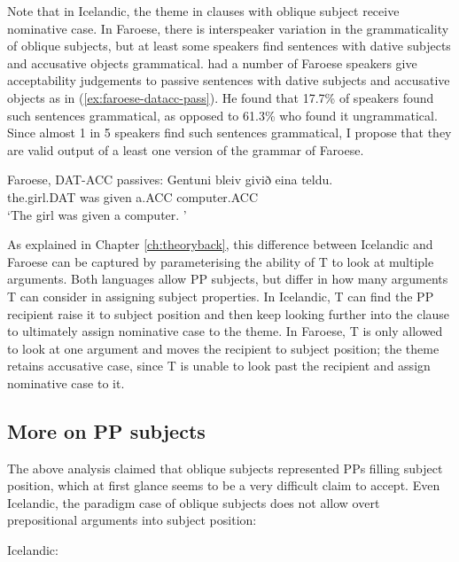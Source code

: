 Note that in Icelandic, the theme in clauses with oblique subject receive nominative case. In Faroese, there is interspeaker variation in the grammaticality of oblique subjects, but at least some speakers find sentences with dative subjects and accusative objects grammatical. \cite{Eyorsson.2012} had a number of Faroese speakers give acceptability judgements to passive sentences with dative subjects and accusative objects as in (\ref{ex:faroese-datacc-pass}). He found that 17.7\% of speakers found such sentences grammatical, as opposed to 61.3\% who found it ungrammatical. Since almost 1 in 5 speakers find such sentences grammatical, I propose that they are valid output of a least one version of the grammar of Faroese.

\begin{exe}
	\ex Faroese, DAT-ACC passives:\label{ex:faroese-datacc-pass}
	\gll Gentuni bleiv givið eina teldu.\\
the.girl.DAT was given a.ACC computer.ACC\\
\trans `The girl was given a computer. \cite[ex 45b]{Eyorsson.2012}'
\end{exe}

As explained in Chapter \ref{ch:theoryback}, this difference between Icelandic and Faroese can be captured by parameterising the ability of T to look at multiple arguments. Both languages allow PP subjects, but differ in how many arguments T can consider in assigning subject properties. In Icelandic, T can find the PP recipient raise it to subject position and then keep looking further into the clause to ultimately assign nominative case to the theme. In Faroese, T is only allowed to look at one argument and moves the recipient to subject position; the theme retains accusative case, since T is unable to look past the recipient and assign nominative case to it.

\subsection{More on PP subjects}
The above analysis claimed that oblique subjects represented PPs filling subject position, which at first glance seems to be a very difficult claim to accept. Even Icelandic, the paradigm case of oblique subjects does not allow overt prepositional arguments into subject position: 

\begin{exe}
	\ex Icelandic:\label{ex:ice-ppsbj}
	\begin{xlist}
	\end{xlist}
\end{exe}

